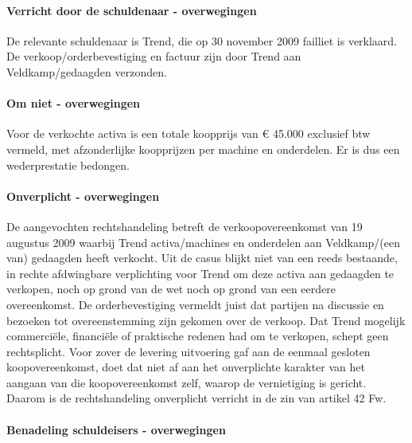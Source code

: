 \documentclass[
  dutch,
  a4paper,
]{article}
\begin{document}
\paragraph{Verricht door de schuldenaar - overwegingen}\label{verricht-door-de-schuldenaar---overwegingen-64}

De relevante schuldenaar is Trend, die op 30 november 2009 failliet is verklaard. De verkoop/orderbevestiging en factuur zijn door Trend aan Veldkamp/gedaagden verzonden.

\paragraph{Om niet - overwegingen}\label{om-niet---overwegingen-64}

Voor de verkochte activa is een totale koopprijs van € 45.000 exclusief btw vermeld, met afzonderlijke koopprijzen per machine en onderdelen. Er is dus een wederprestatie bedongen.

\paragraph{Onverplicht - overwegingen}\label{onverplicht---overwegingen-64}

De aangevochten rechtshandeling betreft de verkoopovereenkomst van 19 augustus 2009 waarbij Trend activa/machines en onderdelen aan Veldkamp/(een van) gedaagden heeft verkocht. Uit de casus blijkt niet van een reeds bestaande, in rechte afdwingbare verplichting voor Trend om deze activa aan gedaagden te verkopen, noch op grond van de wet noch op grond van een eerdere overeenkomst. De orderbevestiging vermeldt juist dat partijen na discussie en bezoeken tot overeenstemming zijn gekomen over de verkoop. Dat Trend mogelijk commerciële, financiële of praktische redenen had om te verkopen, schept geen rechtsplicht. Voor zover de levering uitvoering gaf aan de eenmaal gesloten koopovereenkomst, doet dat niet af aan het onverplichte karakter van het aangaan van die koopovereenkomst zelf, waarop de vernietiging is gericht. Daarom is de rechtshandeling onverplicht verricht in de zin van artikel 42 Fw.

\paragraph{Benadeling schuldeisers - overwegingen}\label{benadeling-schuldeisers---overwegingen-64}
\end{document}
